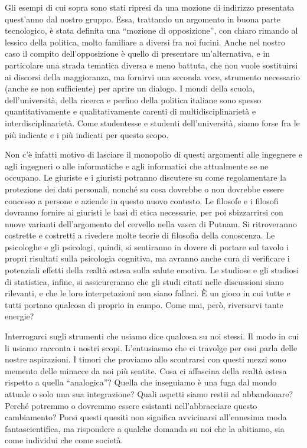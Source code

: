 \documentclass{article}
\begin{document}
Gli esempi di cui sopra sono stati ripresi da una mozione di indirizzo
presentata quest'anno dal nostro gruppo. Essa, trattando un argomento in buona
parte tecnologico, è stata definita una ``mozione di opposizione'', con chiaro
rimando al lessico della politica, molto familiare a diversi fra noi fucini.
Anche nel nostro caso il compito dell'opposizione è quello di presentare
un'alternativa, e in particolare una strada tematica diversa e meno battuta, che
non vuole sostituirsi ai discorsi della maggioranza, ma fornirvi una seconda
voce, strumento necessario (anche se non sufficiente) per aprire un dialogo. I
mondi della scuola, dell'università, della ricerca e perfino della politica
italiane sono spesso quantitativamente e qualitativamente carenti di
multidisciplinarietà e interdisciplinarietà. Come studentesse e studenti
dell'università, siamo forse fra le più indicate e i più indicati per questo
scopo.

Non c'è infatti motivo di lasciare il monopolio di questi argomenti alle
ingegnere e agli ingegneri o alle informatiche e agli informatici che
attualmente se ne occupano. Le giuriste e i giuristi potranno discutere su come
regolamentare la protezione dei dati personali, nonché su cosa dovrebbe o non
dovrebbe essere concesso a persone e aziende in questo nuovo contesto. Le
filosofe e i filosofi dovranno fornire ai giuristi le basi di etica necessarie,
per poi sbizzarrirsi con nuove varianti dell'argomento del cervello nella vasca
di Putnam. Si ritroveranno costrette e costretti a rivedere molte teorie di
filosofia della conoscenza. Le psicologhe e gli psicologi, quindi, si sentiranno
in dovere di portare sul tavolo i propri risultati sulla psicologia cognitiva,
ma avranno anche cura di verificare i potenziali effetti della realtà estesa
sulla salute emotiva. Le studiose e gli studiosi di statistica, infine, si
assicureranno che gli studi citati nelle discussioni siano rilevanti, e che le
loro interpetazioni non siano fallaci. È un gioco in cui tutte e tutti portano
qualcosa di proprio in campo. Come mai, però, riversarvi tante energie?

Interrogarci sugli strumenti che usiamo dice qualcosa su noi stessi. Il modo in
cui li usiamo racconta i nostri scopi. L'entusiasmo che ci travolge per essi
parla delle nostre aspirazioni. I timori che proviamo allo scontrarsi con questi
mezzi sono memento delle minacce da noi più sentite. Cosa ci affascina della
realtà estesa rispetto a quella ``analogica''? Quella che inseguiamo è una fuga
dal mondo attuale o solo una sua integrazione? Quali aspetti siamo restii ad
abbandonare? Perché potremmo o dovremmo essere esistanti nell'abbracciare questo
cambiamento? Porsi questi quesiti non significa avvicinarsi all'ennesima moda
fantascientifica, ma rispondere a qualche domanda su noi che la abitiamo, sia
come individui che come società.
\end{document}
